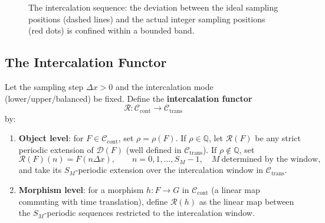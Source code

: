 \begin{figure}[htbp]
\centering
{}
\caption{The intercalation sequence: the deviation between the ideal sampling positions (dashed lines) and the actual integer sampling positions (red dots) is confined within a bounded band.}
\label{fig:intercalation_error}
\end{figure}

\subsection{The Intercalation Functor}

\begin{definition}\label{def:intercalation_functor}
Let the sampling step $\Delta x>0$ and the intercalation mode (lower/upper/balanced) be fixed. Define the \textbf{intercalation functor}
\[
\mathcal{R}:\mathcal{C}_{\text{cont}}\to\mathcal{C}_{\text{trans}}
\]
by:
\begin{enumerate}[label=(\roman*)]
    \item \textbf{Object level}: for $F\in\mathcal{C}_{\text{cont}}$, set $\rho=\rho(F)$. If $\rho\in\mathbb{Q}$, let $\mathcal{R}(F)$ be any strict periodic extension of $\mathcal{D}(F)$ (well defined in $\mathcal{C}_{\text{trans}}$). If $\rho\notin\mathbb{Q}$, set
    \[
    \mathcal{R}(F)(n)=F(n\Delta x),\qquad n=0,1,\dots,S_M-1,\quad M\ \text{determined by the window},
    \]
    and take its $S_M$-periodic extension over the intercalation window in $\mathcal{C}_{\text{trans}}$.
    \item \textbf{Morphism level}: for a morphism $h:F\to G$ in $\mathcal{C}_{\text{cont}}$ (a linear map commuting with time translation), define $\mathcal{R}(h)$ as the linear map between the $S_M$-periodic sequences restricted to the intercalation window.
\end{enumerate}
\end{definition}

